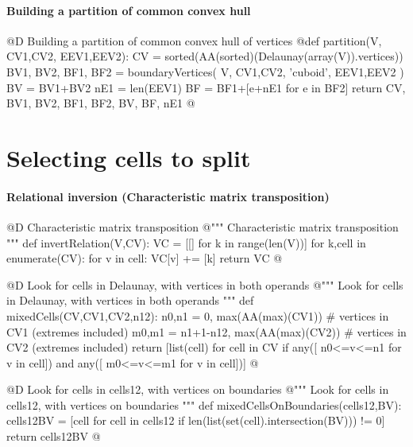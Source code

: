 \documentclass[11pt,oneside]{article}	%
\begin{document}
\paragraph{Building a partition of common convex hull}

@D Building a partition of common convex hull of vertices
@{def partition(V, CV1,CV2, EEV1,EEV2):
	CV = sorted(AA(sorted)(Delaunay(array(V)).vertices))
	BV1, BV2, BF1, BF2 = boundaryVertices( V, CV1,CV2, 'cuboid', EEV1,EEV2 )
	BV = BV1+BV2
	nE1 = len(EEV1)
	BF = BF1+[e+nE1 for e in BF2]
	return CV, BV1, BV2, BF1, BF2, BV, BF, nE1
@}




\section{Selecting cells to split}


\paragraph{Relational inversion (Characteristic matrix transposition)}

@D Characteristic matrix transposition
@{""" Characteristic matrix transposition """
def invertRelation(V,CV):
	VC = [[] for k in range(len(V))]
	for k,cell in enumerate(CV):
		for v in cell:
			VC[v] += [k]
	return VC
@}


@D Look for cells in Delaunay, with vertices in both operands
@{""" Look for cells in Delaunay, with vertices in both operands """
def mixedCells(CV,CV1,CV2,n12):
	n0,n1 = 0, max(AA(max)(CV1))			# vertices in CV1 (extremes included)
	m0,m1 = n1+1-n12, max(AA(max)(CV2))		# vertices in CV2 (extremes included)
	return [list(cell) for cell in CV if any([ n0<=v<=n1 for v in cell]) 
		and any([ m0<=v<=m1 for v in cell])]
@}

@D Look for cells in cells12, with vertices on boundaries
@{""" Look for cells in cells12, with vertices on boundaries """
def mixedCellsOnBoundaries(cells12,BV):
	cells12BV = [cell for cell in cells12
					if len(list(set(cell).intersection(BV))) != 0]
	return cells12BV
@}
\end{document}
